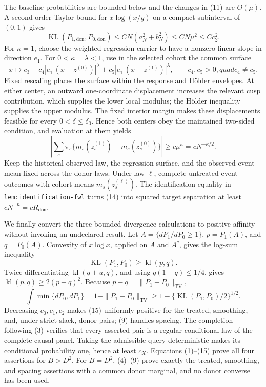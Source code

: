 The baseline probabilities are bounded below and the changes in (11) are \(O(\mu)\).  A second-order Taylor bound for \(x\log(x/y)\) on a compact subinterval of \((0,1)\) gives
\[
\operatorname{KL}(P_{1,\mathrm{don}},P_{0,\mathrm{don}})
\leq CN(a_N^2+b_N^2)
\leq CN\mu^2\leq Cc_2^2.
\tag{12}
\]
For \(\kappa=1\), choose the weighted regression carrier to have a nonzero linear slope in direction \(e_1\).  For \(0<\kappa=\lambda<1\), use in the selected cohort the common surface
\[
x\longmapsto c_3+c_4|e_1^\top(x-z^{(0)})|^\lambda
+c_5|e_1^\top(x-z^{(1)})|^\lambda,
\qquad c_4,c_5>0,quad c_4\ne c_5.
\tag{13}
\]
Fixed rescaling places the surface within the response and H\"older envelopes.  At either center, an outward one-coordinate displacement increases the relevant cusp contribution, which supplies the lower local modulus; the H\"older inequality supplies the upper modulus.  The fixed interior margin makes these displacements feasible for every \(0<\delta\leq\delta_0\).  Hence both centers obey the maintained two-sided condition, and evaluation at them yields
\[
\left|\sum_s\pi_s\{m_s(z_s^{(1)})-m_s(z_s^{(0)})\}\right|
\geq c\mu^\kappa=cN^{-\kappa/2}.
\tag{14}
\]
Keep the historical observed law, the regression surface, and the observed event mean fixed across the donor laws.  Under law \(\ell\), complete untreated event outcomes with cohort means \(m_s(z_s^{(\ell)})\).  The identification equality in \texttt{lem:identification-fwl} turns (14) into squared target separation at least \(cN^{-\kappa}=cR_{\mathrm{don}}\).

We finally convert the three bounded-divergence calculations to positive affinity without invoking an undeclared result.  Let \(A=\{dP_1/dP_0\geq1\}\), \(p=P_1(A)\), and \(q=P_0(A)\).  Convexity of \(x\log x\), applied on \(A\) and \(A^c\), gives the log-sum inequality
\[
\operatorname{KL}(P_1,P_0)\geq\operatorname{kl}(p,q).
\]
Twice differentiating \(\operatorname{kl}(q+u,q)\), and using \(q(1-q)\leq1/4\), gives
\(\operatorname{kl}(p,q)\geq2(p-q)^2\).  Because
\(p-q=\|P_1-P_0\|_{\mathrm{TV}}\),
\[
\int\min\{dP_0,dP_1\}
=1-\|P_1-P_0\|_{\mathrm{TV}}
\geq1-\{\operatorname{KL}(P_1,P_0)/2\}^{1/2}.
\tag{15}
\]
Decreasing \(c_0,c_1,c_2\) makes (15) uniformly positive for the treated, smoothing, and, under strict slack, donor pairs; (9) handles spacing.  The completion following (3) verifies that every asserted pair is a regular conditional law of the complete causal panel.  Taking the admissible query deterministic makes its conditional probability one, hence at least \(c_X\).  Equations (1)--(15) prove all four assertions for \(B>D^2\).  For \(B=D^2\), (4)--(9) prove exactly the treated, smoothing, and spacing assertions with a common donor marginal, and no donor converse has been used.

